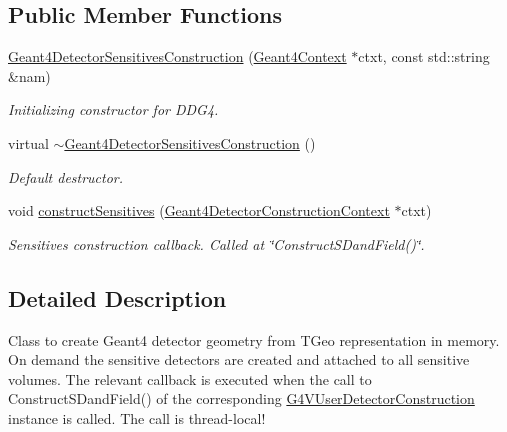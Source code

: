 \subsection*{Public Member Functions}
\begin{DoxyCompactItemize}
\item 
\hyperlink{class_d_d4hep_1_1_simulation_1_1_geant4_detector_sensitives_construction_a71ee5bd251232f76d5891b2e7047ba76}{Geant4DetectorSensitivesConstruction} (\hyperlink{class_d_d4hep_1_1_simulation_1_1_geant4_context}{Geant4Context} $\ast$ctxt, const std::string \&nam)
\begin{DoxyCompactList}\small\item\em Initializing constructor for DDG4. \item\end{DoxyCompactList}\item 
virtual \hyperlink{class_d_d4hep_1_1_simulation_1_1_geant4_detector_sensitives_construction_a3013821bbc1d900a35f0a4e26a1956b6}{$\sim$Geant4DetectorSensitivesConstruction} ()
\begin{DoxyCompactList}\small\item\em Default destructor. \item\end{DoxyCompactList}\item 
void \hyperlink{class_d_d4hep_1_1_simulation_1_1_geant4_detector_sensitives_construction_ae698013abe689d2e76e1423d5e08f246}{constructSensitives} (\hyperlink{class_d_d4hep_1_1_simulation_1_1_geant4_detector_construction_context}{Geant4DetectorConstructionContext} $\ast$ctxt)
\begin{DoxyCompactList}\small\item\em Sensitives construction callback. Called at \char`\"{}ConstructSDandField()\char`\"{}. \item\end{DoxyCompactList}\end{DoxyCompactItemize}


\subsection{Detailed Description}
Class to create Geant4 detector geometry from TGeo representation in memory. On demand the sensitive detectors are created and attached to all sensitive volumes. The relevant callback is executed when the call to ConstructSDandField() of the corresponding \hyperlink{class_g4_v_user_detector_construction}{G4VUserDetectorConstruction} instance is called. The call is thread-\/local!

